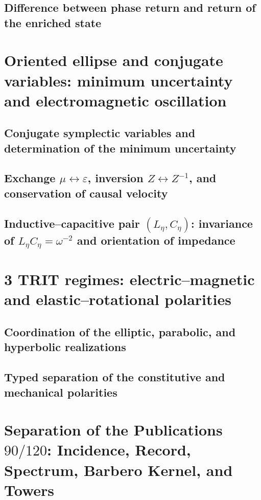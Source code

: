 \subsection{Difference between phase return and return of the enriched state}


\section{Oriented ellipse and conjugate variables: minimum uncertainty and electromagnetic oscillation}
\subsection{Conjugate symplectic variables and determination of the minimum uncertainty}

\subsection{Exchange \(\mu\leftrightarrow\varepsilon\), inversion \(Z\leftrightarrow Z^{-1}\), and conservation of causal velocity}

\subsection{Inductive--capacitive pair \((L_\eta,C_\eta)\): invariance of \(L_\eta C_\eta=\omega^{-2}\) and orientation of impedance}


\section{3 TRIT regimes: electric--magnetic and elastic--rotational polarities}
\subsection{Coordination of the elliptic, parabolic, and hyperbolic realizations}

\subsection{Typed separation of the constitutive and mechanical polarities}


\section{Separation of the Publications \(90/120\): Incidence, Record, Spectrum, Barbero Kernel, and Towers}
